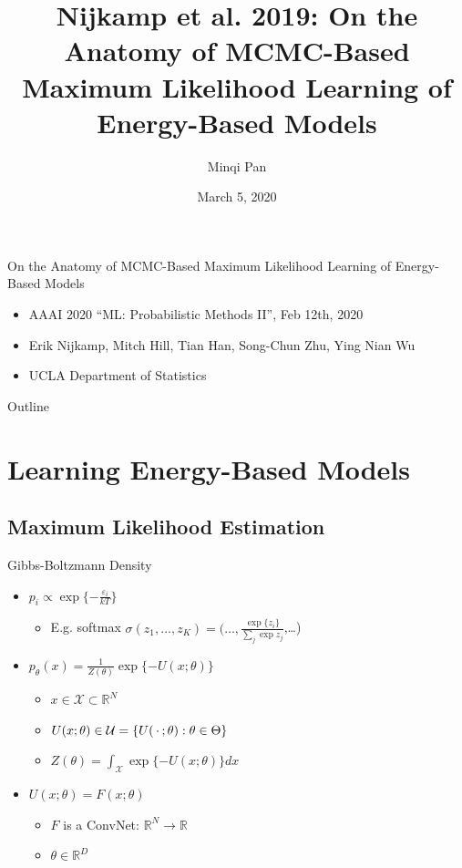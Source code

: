 \documentclass{beamer}
\title[Nijkamp et al. 2019: Anatomy of MCMC-based MLL of EBM]{Nijkamp et al. 2019: On the Anatomy of MCMC-Based Maximum Likelihood Learning of Energy-Based Models}
\author{Minqi Pan}
\date{March 5, 2020}
\newcommand*{\Z}{\makebox[1.5ex]{\textbf{$\cdot$}}}
\begin{document}
\begin{frame}
  \titlepage
\end{frame}

\begin{frame}{On the Anatomy of MCMC-Based Maximum Likelihood Learning of Energy-Based Models}
\begin{itemize}
\item AAAI 2020 ``ML: Probabilistic Methods II'', Feb 12th, 2020
\item Erik Nijkamp, Mitch Hill, Tian Han, Song-Chun Zhu, Ying Nian Wu
\item UCLA Department of Statistics
\end{itemize}
\end{frame}

\begin{frame}{Outline}
  \tableofcontents
\end{frame}

\section{Learning Energy-Based Models}
\subsection{Maximum Likelihood Estimation}
\begin{frame}{Gibbs-Boltzmann Density}
\begin{itemize}
\item $p_i\propto\exp\{-\frac{\varepsilon_i}{kT}\}$
\begin{itemize}
\item E.g. softmax $\sigma(z_1,\dots,z_K)=(\dots,\frac{\exp\{z_i\}}{\sum_j\exp{z_j}}$,\dots)
\end{itemize}
\item $p_\theta(x)=\frac{1}{Z(\theta)}\exp\{-U(x;\theta)\}$
\begin{itemize}
\item $x\in\mathcal{X}\subset\mathbb{R}^N$
\item $U(x;\theta)\in\mathcal{U}=\{U(\Z;\theta):\theta\in\Theta\}$
\item $Z(\theta)=\int_\mathcal{X}\exp\{-U(x;\theta)\}dx$
\end{itemize}
\item $U(x;\theta)=F(x;\theta)$
\begin{itemize}
\item $F$ is a ConvNet: $\mathbb{R}^N\to\mathbb{R}$
\item $\theta\in\mathbb{R}^D$
\end{itemize}
\end{itemize}
\end{frame}
\end{document}
